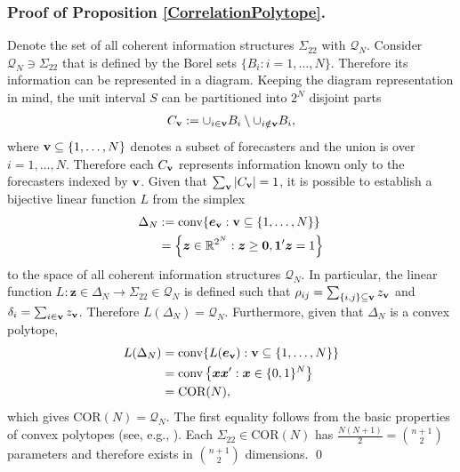 \documentclass[11pt]{article}
\theoremstyle{definition}
\theoremstyle{definition}
\def\one{{\bf 1}}
\def\v{{\bf v}}
\begin{document}
\subsubsection{Proof of Proposition \ref{CorrelationPolytope}.}
Denote the set of all coherent information structures $\Sigma_{22}$ with $\mathcal{Q}_N$. Consider $\mathcal{Q}_N \ni \Sigma_{22}$ that is defined by the Borel sets $\{ B_i : i = 1, \dots, N\}$.  Therefore its information can be represented in a diagram. Keeping the diagram representation in mind, the unit interval $S$ can be partitioned into $2^N$ disjoint parts
\begin{align*}
C_\v := \cup_{i \in \v} B_i \setminus \cup_{i \notin \v} B_i,
\end{align*}
where $\v \subseteq \{1, \dots, N\}$ denotes a subset of forecasters and the union is over $i = 1, \dots, N$. Therefore each $C_\v$ represents information known only to the forecasters indexed by $\v$. Given that $\sum_{\v} |C_\v|  = 1$, it is possible to establish a bijective linear function $L$ from the simplex
\begin{align*}
\Delta_N &:= \text{conv}\{  \boldsymbol{e}_\v : \v \subseteq \{1, \dots, N\} \}\\
&= \left\{ \boldsymbol{z} \in \mathbb{R}^{2^N} : \boldsymbol{z} \geq \boldsymbol{0}, \boldsymbol{1}'\boldsymbol{z} = 1 \right\}
\end{align*}
to the space of all coherent information structures $\mathcal{Q}_N$. In particular, the linear function $L: \boldsymbol{z} \in \Delta_N \to \Sigma_{22} \in \mathcal{Q}_N$ is defined such that $\rho_{ij} = \sum_{\{i,j\} \subseteq \v} z_\v$ and $\delta_i =  \sum_{i \in \v} z_\v$. Therefore $L(\Delta_N) = \mathcal{Q}_N$. Furthermore, given that $\Delta_N$ is a convex polytope, 
\begin{align*}
L(\Delta_N) &= \text{conv}\{  L(\boldsymbol{e}_\v) : \v \subseteq \{1, \dots, N\} \}\\
&=  \text{conv} \left\{\boldsymbol{x}\boldsymbol{x}' : \boldsymbol{x}  \in \{0,1\}^N \right\}\\
&= \text{COR}(N),
\end{align*}
which gives $\text{COR}(N) = \mathcal{Q}_N$. The first equality follows from the basic properties of convex polytopes (see, e.g., \citealt{mcmullen1971convex}).  Each $\Sigma_{22} \in \text{COR}(N)$ has $\frac{N(N+1)}{2} = \binom{n+1}{2}$ parameters and therefore exists in $\binom{n+1}{2}$ dimensions. \qed
\end{document}
